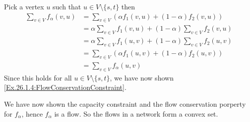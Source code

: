 Pick a vertex $u$ such that $u\in V\setminus\{s,t\}$ then 
\begin{align*}
  \sum_{v\in V}f_{\alpha}(v,u) &= \sum_{v\in V} \left(\alpha f_1(v,u) + (1- \alpha)f_2(v,u) \right)\\
    &= \alpha \sum_{v\in V} f_1(v,u) + (1- \alpha) \sum_{v\in V} f_2(v,u)\\
    &= \alpha \sum_{v\in V} f_1(u,v) + (1- \alpha) \sum_{v\in V} f_2(u,v)\\
    &= \sum_{v\in V} \left(\alpha f_1(u,v) + (1- \alpha)f_2(u,v) \right)\\
    &= \sum_{v\in V}f_{\alpha}(u,v)
\end{align*}
Since this holds for all $u\in V\setminus\{s,t\}$, we have now shown \eqref{Ex.26.1.4:FlowConservationConstraint}.

We have now shown the capacity constraint and the flow conservation porperty for $f_{\alpha}$, hence $f_{\alpha}$ is a flow. So the flows in a network form a convex set.